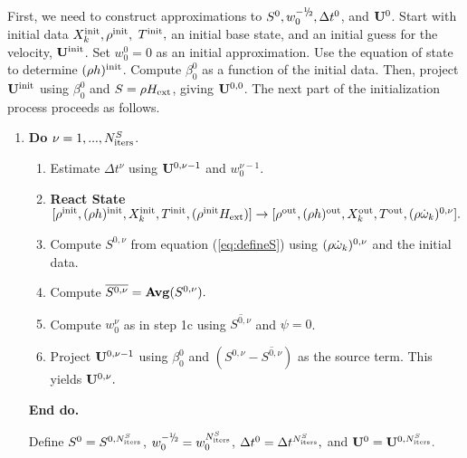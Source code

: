 First, we need to construct approximations to $S^0, w_0^{-\myhalf}, \Delta t^0$, 
and ${\bf U}^0$.  Start with initial data $X_k^{\mathrm{init}}, \rho^{\mathrm{init}},$ $T^{\mathrm{init}},$ an 
initial base state, and an initial guess for the velocity, ${\bf U}^{\mathrm{init}}$.
Set $w_0^0 = 0$ as an initial approximation.  Use the equation of state to 
determine $(\rho h)^{\mathrm{init}}$.  Compute $\beta_0^0$ as a function of 
the initial data.  Then, project ${\bf U}^{\mathrm{init}}$ using $\beta_0^0$ and 
$S = \rho{H_{\rm ext}}$, giving ${\bf U}^{0,0}$.  The next part of the initialization process 
proceeds as follows.

\begin{enumerate}
\renewcommand{\theenumi}{{\bf \alph{enumi}}}
\renewcommand{\labelenumii}{\roman{enumii}.}

\item {\bf Do} {$\nu = 1,...,N_{\rm iters}^{S}$.}
  \begin{enumerate}

  \item Estimate $\Delta t^\nu$ using ${\bf U}^{0,\nu-1}$ and $w_0^{\nu-1}.$

  \item {\bf React State}$[ \rho^{\mathrm{init}},(\rho h)^{\mathrm{init}}, X_k^{\mathrm{init}}, T^{\mathrm{init}}, (\rho^{\mathrm{init}} {H_{\rm ext}}) ] \rightarrow [\rho^{\mathrm{out}}, (\rho h)^{\mathrm{out}}, X_k^{\mathrm{out}}, T^{\mathrm{out}}, (\rho \dot{\omega}_k)^{0,\nu} ].$

  \item Compute $S^{0,\nu}$ from equation (\ref{eq:defineS}) 
        using $(\rho \dot{\omega}_k)^{0,\nu}$ and the initial data.

  \item Compute $\overline{S^{0,\nu}} = {\mathrm{\bf Avg}} (S^{0,\nu}).$

  \item Compute $w_0^{\nu}$ as in step 1c using $\overline{S^{0,\nu}}$ and $\psi=0$.
        
  \item Project ${\bf U}^{0,\nu-1}$ using $\beta_0^0$ and 
        $(S^{0,\nu} - \overline{S^{0,\nu}})$ as the source term.  
        This yields ${\bf U}^{0,\nu}.$

  \end{enumerate}

  {\bf End do.}

  Define $S^0 = S^{0,N_{\rm iters}^S}$, $w_0^{-\myhalf} = w_0^{N_{\rm iters}^S}$, 
$\Delta t^0 = \Delta t^{N_{\rm iters}^S},$ and ${\bf U}^0 = {\bf U}^{0,N_{\rm iters}^S}.$

\end{enumerate}


